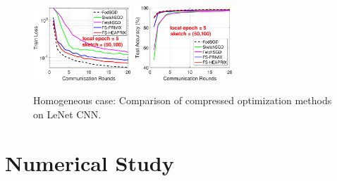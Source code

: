 \documentclass{article} %
\begin{document}
\begin{figure}[t]
\begin{center}
{		\includegraphics[width=1.45in]{MNIST_figures/local5_sketch50_iid1_train_loss.eps}\hspace{-0.12in}
		\includegraphics[width=1.45in]{MNIST_figures/local5_sketch50_iid1_test_acc.eps}
		}
	\end{center}
	\vspace{-0.1in}
	\caption{Homogeneous case: Comparison of compressed optimization methods on LeNet CNN.}
    \label{fig:MNIST-iid1}
    \vspace{-0.1in}
\end{figure}

\vspace{-0.15in}
\section{Numerical Study}\label{sec:experiment}
\vspace{-0.05in}
\end{document}
